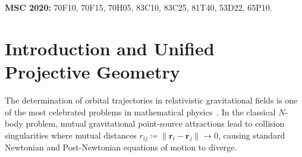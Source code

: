 \documentclass[11pt,a4paper,reqno]{article}
\theoremstyle{plain}
\theoremstyle{definition}
\theoremstyle{remark}
\numberwithin{equation}{section}
\begin{document}
\vspace{0.4ex}
\noindent\textbf{MSC 2020:} 70F10, 70F15, 70H05, 83C10, 83C25, 81T40, 53D22, 65P10.

\clearpage
\begingroup
\small
\tableofcontents
\endgroup
\clearpage

\section{Introduction and Unified Projective Geometry}
\label{sec:introduction}

The determination of orbital trajectories in relativistic gravitational fields is one of the most celebrated problems in mathematical physics~\cite{Kepler1609, Poincare1892, Einstein1915}. In the classical $N$-body problem, mutual gravitational point-source attractions lead to collision singularities where mutual distances $r_{ij} \coloneqq \|\bm{r}_i - \bm{r}_j\| \to 0$, causing standard Newtonian and Post-Newtonian equations of motion to diverge.
\end{document}

